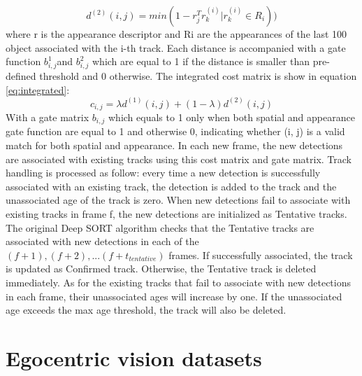 \begin{equation}
	\label{eq:appearance}
	d^{(2)}(i,j)=min(1-r_j^Tr_k^{(i)}|r_k^{(i)}\in R_i))
\end{equation}
where r is the appearance descriptor and Ri are the appearances of the last 100 object associated with the i-th track. Each distance is accompanied with a gate function \(b_{i,j}^1\)and \(b_{i,j}^2\) which are equal to 1 if the distance is smaller than pre-defined threshold and 0 otherwise. The integrated cost matrix is show in equation \ref{eq:integrated}:
\begin{equation}
	\label{eq:integrated}
	c_{i,j} = \lambda d^{(1)}(i,j) + (1-\lambda)d^{(2)}(i,j)
\end{equation}
With a gate matrix \(b_{i,j}\) which equals to 1 only when both spatial and appearance gate function are equal to 1 and otherwise 0, indicating whether (i, j) is a valid match for both spatial and appearance. In each new frame, the new detections are associated with existing tracks using this cost matrix and gate matrix.
Track handling is processed as follow: every time a new detection is successfully associated with an existing track, the detection is added to the track and the unassociated age of the track is zero. When new detections fail to associate with existing tracks in frame f, the new detections are initialized as Tentative tracks. The original Deep SORT algorithm checks that the Tentative tracks are associated with new detections in each of the  \((f+1), (f+2), ... (f+t_{tentative})\) frames. If successfully associated, the track is updated as Confirmed track. Otherwise, the Tentative track is deleted immediately. As for the existing tracks that fail to associate with new detections in each frame, their unassociated ages will increase by one. If the unassociated age exceeds the max age threshold, the track will also be deleted.
\section{Egocentric vision datasets}\label{sec:datasets}
